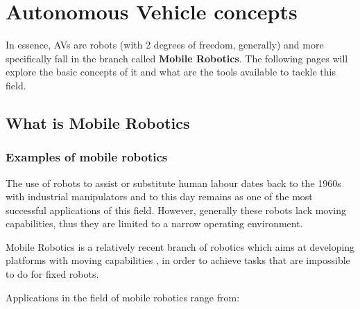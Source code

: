 
\chapter{Autonomous Vehicle concepts}
\label{ch:concepts}

In essence, AVs are robots (with 2 degrees of freedom, generally) and more specifically fall in the branch called \textbf{Mobile Robotics}. The following pages will explore the basic concepts of it and what are the tools available to tackle this field.

\section{What is Mobile Robotics}

\subsection{Examples of mobile robotics}

The use of robots to assist or substitute human labour dates back to the 1960s  with industrial manipulators and to this day remains as one of the most successful applications of this field. However, generally these robots lack moving capabilities, thus they are limited to a narrow operating environment. 

Mobile Robotics is a relatively recent branch of robotics which aims at developing platforms with moving capabilities , in order to achieve tasks that are impossible to do for fixed robots.

Applications in the field of mobile robotics range from:

